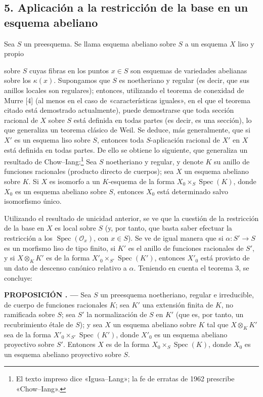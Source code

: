 \documentclass[11pt,twoside,openany]{book}
\numberwithin{equation}{section}
\newcommand{\src}[1]{%
  \phantomsection\hypertarget{src:#1}{}%
  \marginpar{\raggedleft\footnotesize\sffamily #1}%
}
\theoremstyle{plain}
\theoremstyle{definition}
\theoremstyle{remark}
\newcommand{\result}[2]{%
  \par\medskip\noindent\textbf{#1%
  \if\relax\detokenize{#2}\relax\else\space#2\fi. ---}\enspace
}
\newcommand{\FgaUnitKey}{frontmatter}
\renewcommand{\src}[1]{%
  \phantomsection\hypertarget{src:\FgaUnitKey:#1}{}%
  \marginpar{\raggedleft\footnotesize\sffamily #1}%
}
\theoremstyle{plain}
\theoremstyle{definition}
\theoremstyle{remark}
\begin{document}
\subsection*{5. Aplicación a la restricción de la base en un esquema abeliano}

Sea $S$ un preesquema. Se llama esquema abeliano sobre $S$ a un esquema $X$
liso y propio

\src{324}
sobre $S$ cuyas fibras en los puntos $x\in S$ son esquemas de variedades
abelianas sobre los $\kappa(x)$. Supongamos que $S$ es noetheriano y regular
(es decir, que sus anillos locales son regulares); entonces, utilizando el
teorema de conexidad de Murre [4] (al menos en el caso de «características
iguales», en el que el teorema citado está demostrado actualmente), puede
demostrarse que toda sección racional de $X$ sobre $S$ está definida en todas
partes (es decir, es una sección), lo que generaliza un teorema clásico de
Weil. Se deduce, más generalmente, que si $X'$ es un esquema liso sobre $S$,
entonces toda $S$-aplicación racional de $X'$ en $X$ está definida en todas
partes. De ello se obtiene lo siguiente, que generaliza un resultado de
Chow--Iang:\footnote{El texto impreso dice «Igusa--Lang»; la fe de erratas de
1962 prescribe «Chow--Iang».} Sea $S$ noetheriano y regular, y denote $K$ su
anillo de funciones racionales (producto directo de cuerpos); sea $X$ un
esquema abeliano sobre $K$. Si $X$ es isomorfo a un $K$-esquema de la forma
$X_0\times_S\operatorname{Spec}(K)$, donde $X_0$ es un esquema abeliano sobre
$S$, entonces $X_0$ está determinado salvo isomorfismo único.

Utilizando el resultado de unicidad anterior, se ve que la cuestión de la
restricción de la base en $X$ es local sobre $S$ (y, por tanto, que basta saber
efectuar la restricción a los $\operatorname{Spec}(\mathcal O_x)$, con
$x\in S$). Se ve de igual manera que si
$\alpha:S'\longrightarrow S$ es un morfismo liso de tipo finito, si $K'$ es el
anillo de funciones racionales de $S'$, y si $X\otimes_KK'$ es de la forma
$X'_0\times_{S'}\operatorname{Spec}(K')$, entonces $X'_0$ está provisto de un
dato de descenso canónico relativo a $\alpha$. Teniendo en cuenta el teorema 3,
se concluye:

\result{PROPOSICIÓN}{5.1} Sea $S$ un preesquema noetheriano, regular e
irreducible, de cuerpo de funciones racionales $K$; sea $K'$ una extensión
finita de $K$, no ramificada sobre $S$; sea $S'$ la normalización de $S$ en
$K'$ (que es, por tanto, un recubrimiento étale de $S$); y sea $X$ un esquema
abeliano sobre $K$ tal que $X\otimes_KK'$ sea de la forma
$X'_0\times_{S'}\operatorname{Spec}(K')$, donde $X'_0$ es un esquema abeliano
proyectivo sobre $S'$. Entonces $X$ es de la forma
$X_0\times_S\operatorname{Spec}(K)$, donde $X_0$ es un esquema abeliano
proyectivo sobre $S$.
\end{document}
